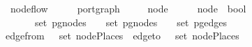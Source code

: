 \ node{\isacharunderscore}flow\ {\isacharcolon}{\isacharcolon}\ {\isachardoublequoteopen}{\isacharparenleft}\ \ \ \ port{\isacharunderscore}graph\isanewline
{}\ {\isacharparenleft}\ \ \ \ node\ {\isasymRightarrow}\ {\isacharparenleft}\ \ \ \ node\ {\isasymRightarrow}\ bool{\isachardoublequoteclose}\isanewline
\ \ \isanewline
\ \ \ \ {\isachardoublequoteopen}{\isasymlbrakk}\ {\isasymin}\ set\ {\isacharparenleft}pg{\isacharunderscore}nodes\ \ \ {\isasymin}\ set\ {\isacharparenleft}pg{\isacharunderscore}nodes\ \ \ {\isasymin}\ set\ {\isacharparenleft}pg{\isacharunderscore}edges\ \isanewline
\isaindent{\ \ \ \ {\isachardoublequoteopen}{\isasymlbrakk}}edge{\isacharunderscore}from\ \ {\isasymin}\ set\ {\isacharparenleft}nodePlaces\ \ edge{\isacharunderscore}to\ \ {\isasymin}\ set\ {\isacharparenleft}nodePlaces\ \isanewline
\isaindent{\ \ \ \ {\isachardoublequoteopen}}{\isasymLongrightarrow}\ \ 

